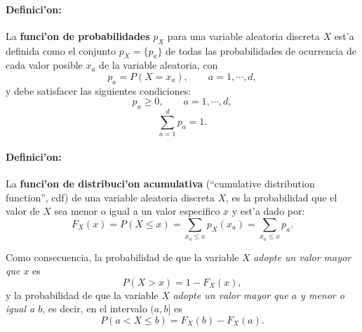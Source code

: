 \documentclass[letterpaper,11pt]{report}
\begin{document}


\paragraph{Definici'on:} La \textbf{funci'on de probabilidades} $p_X$ para una variable aleatoria discreta $X$ est'a definida como el conjunto $p_X=\{p_a\}$ de todas las probabilidades de ocurrencia de cada valor posible $x_a$ de la variable aleatoria, con
\begin{equation}
p_a=P(X=x_a) , \qquad   a=1,\cdots, d,
\end{equation}
y debe satisfacer las siguientes condiciones:
\begin{equation}
p_a\geq 0, \qquad  a=1,\cdots, d,
\end{equation}
\begin{equation}
\sum_{a=1}^d p_a=1.
\end{equation}
		 
\paragraph{Definici'on:} La \textbf{funci'on de distribuci'on acumulativa} (``cumulative distribution function'', cdf) de una variable aleatoria discreta $X$, es la probabilidad que el valor de $X$ sea menor o igual a un valor especifico $x$ y est'a dado por:
\begin{equation}
F_X(x)=P(X\le x)=\sum_{x_a\le x}p_X(x_a)=\sum_{x_a\le x}p_a.
\end{equation}
		
Como consecuencia, la probabilidad de que la variable $X$ \textit{adopte un valor mayor que $x$} es
\begin{equation}
P(X> x) = 1 - F_X(x),
\end{equation}
y la probabilidad de que la variable $X$ \textit{adopte un valor mayor que $a$ y menor o igual a $b$}, es decir, en el intervalo $(a,b]$ es
\begin{equation}
P(a<X\le b) = F_X(b)-F_X(a).
\end{equation}
%		 
 
\end{document}
